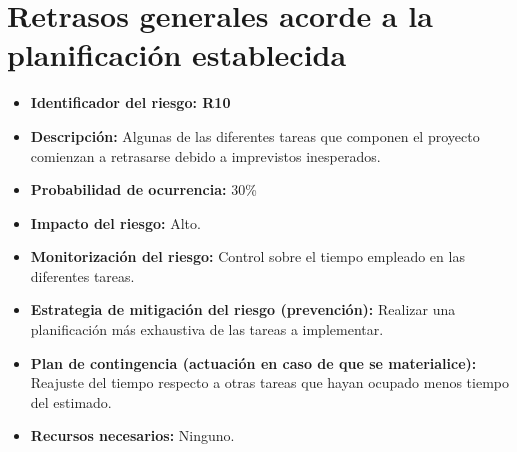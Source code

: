 \section{Retrasos generales acorde a la planificación establecida}
\begin{itemize}
	\item \textbf{Identificador del riesgo: R10}
	\item \textbf{Descripción: } Algunas de las diferentes tareas que componen el proyecto comienzan a retrasarse debido a imprevistos inesperados.
	\item \textbf{Probabilidad de ocurrencia: } 30\%
	\item \textbf{Impacto del riesgo: } Alto.
	\item \textbf{Monitorización del riesgo: } Control sobre el tiempo empleado en las diferentes tareas.
	\item \textbf{Estrategia de mitigación del riesgo (prevención): } Realizar una planificación más exhaustiva de las tareas a implementar.
	\item \textbf{Plan de contingencia (actuación en caso de que se materialice): } Reajuste del tiempo respecto a otras tareas que hayan ocupado menos tiempo del estimado.
	\item \textbf{Recursos necesarios: } Ninguno.
\end{itemize} 

%
%

       
